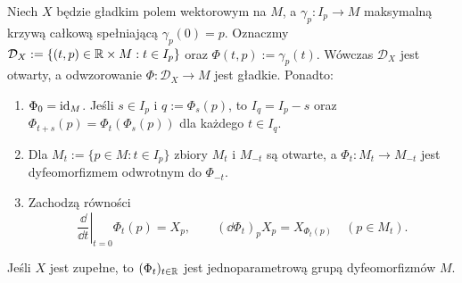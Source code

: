 \begin{twierdzenie}
\label{thm:przeplyw}
Niech $X$ będzie gładkim polem wektorowym na $M$, a
$\gamma_p\colon I_p\to M$ maksymalną krzywą całkową spełniającą
$\gamma_p(0)=p$. Oznaczmy
$\mathcal D_X:=\{(t,p)\in\mathbb{R}\times M:t\in I_p\}$ oraz
$\Phi(t,p):=\gamma_p(t)$.
Wówczas $\mathcal D_X$ jest otwarty, a odwzorowanie
$\Phi\colon\mathcal D_X\to M$ jest gładkie. Ponadto:
\begin{enumerate}
\item $\Phi_0=\mathrm{id}_M$. Jeśli $s\in I_p$ i $q:=\Phi_s(p)$, to
$I_q=I_p-s$ oraz $\Phi_{t+s}(p)=\Phi_t(\Phi_s(p))$
dla każdego $t\in I_q$.
\item Dla $M_t:=\{p\in M:t\in I_p\}$ zbiory $M_t$ i $M_{-t}$
są otwarte, a $\Phi_t\colon M_t\to M_{-t}$ jest dyfeomorfizmem
odwrotnym do $\Phi_{-t}$.
\item Zachodzą równości
\begin{equation}\label{eq:przeplyw-generuje}
\left.\frac{\dd}{\dd t}\right|_{t=0}\Phi_t(p)=X_p,
\qquad (\dd\Phi_t)_pX_p=X_{\Phi_t(p)}
\quad (p\in M_t).
\end{equation}
\end{enumerate}
Jeśli $X$ jest zupełne, to $(\Phi_t)_{t\in\mathbb{R}}$ jest
jednoparametrową grupą dyfeomorfizmów $M$.
\end{twierdzenie}

